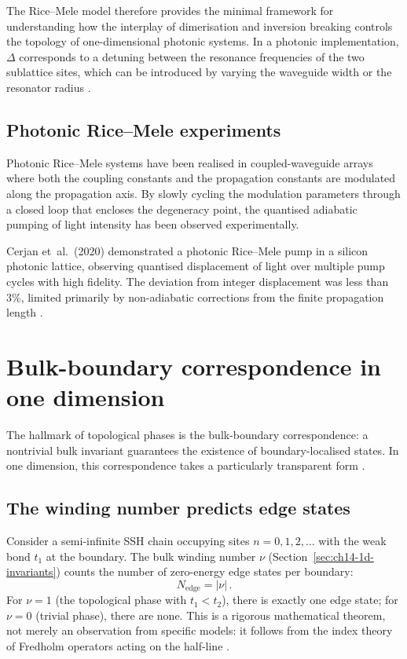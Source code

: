 The Rice--Mele model therefore provides the minimal framework for
understanding how the interplay of dimerisation and inversion breaking
controls the topology of one-dimensional photonic systems.  In a
photonic implementation, $\Delta$ corresponds to a detuning between
the resonance frequencies of the two sublattice sites, which can be
introduced by varying the waveguide width or the resonator radius
\cite{ozawa2018topological,price2022roadmap}.

\subsection{Photonic Rice--Mele experiments}
\label{sec:ch14-rm-photonic}

Photonic Rice--Mele systems have been realised in coupled-waveguide
arrays where both the coupling constants and the propagation constants
are modulated along the propagation axis.  By slowly cycling the
modulation parameters through a closed loop that encloses the
degeneracy point, the quantised adiabatic pumping of light intensity
has been observed experimentally.

Cerjan et~al.\ (2020) demonstrated a photonic Rice--Mele pump in a
silicon photonic lattice, observing quantised displacement of light
over multiple pump cycles with high fidelity.  The deviation from
integer displacement was less than 3\%, limited primarily by
non-adiabatic corrections from the finite propagation length
\cite{price2022roadmap}.

\section{Bulk-boundary correspondence in one dimension}
\label{sec:ch14-bbc-1d}

The hallmark of topological phases is the bulk-boundary correspondence:
a nontrivial bulk invariant guarantees the existence of boundary-localised
states.  In one dimension, this correspondence takes a particularly
transparent form \cite{asbth2016berry}.

\subsection{The winding number predicts edge states}
\label{sec:ch14-winding-edge}

Consider a semi-infinite SSH chain occupying sites $n = 0, 1, 2, \ldots$
with the weak bond $t_1$ at the boundary.  The bulk winding number
$\nu$ (Section~\ref{sec:ch14-1d-invariants}) counts the number of
zero-energy edge states per boundary:
\begin{equation}\label{eq:ch14-bbc-winding}
  N_{\mathrm{edge}} = |\nu|\,.
\end{equation}
For $\nu = 1$ (the topological phase with $t_1 < t_2$), there is
exactly one edge state; for $\nu = 0$ (trivial phase), there are none.
This is a rigorous mathematical theorem, not merely an observation
from specific models: it follows from the index theory of Fredholm
operators acting on the half-line
\cite{asbth2016berry}.

